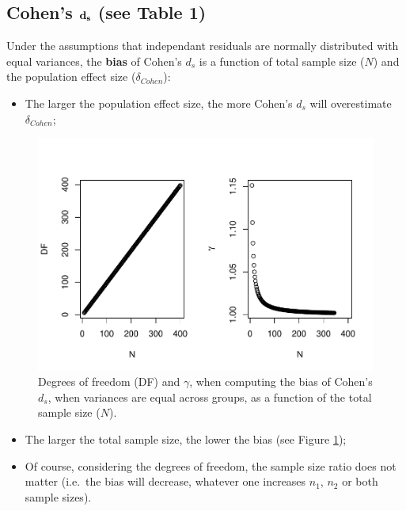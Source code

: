 \documentclass[
  english,
  man]{apa6}
\providecommand{\tightlist}{%
  \setlength{\itemsep}{0pt}\setlength{\parskip}{0pt}}
\begin{document}
\hypertarget{cohens-bf-d_s-see-table-1}{%
\subsection{\texorpdfstring{Cohen's \(\bf d_s\) (see Table 1)}{Cohen's \textbackslash bf d\_s (see Table 1)}}\label{cohens-bf-d_s-see-table-1}}

Under the assumptions that independant residuals are normally distributed with equal variances, the \textbf{bias} of Cohen's \(d_s\) is a function of total sample size (\(N\)) and the population effect size (\(\delta_{Cohen}\)):

\begin{itemize}
\tightlist
\item
  The larger the population effect size, the more Cohen's \(d_s\) will overestimate \(\delta_{Cohen}\);
\end{itemize}

\begin{figure}
\centering
\includegraphics{Theoretical-Bias-of-all-estimators-as-a-function-of-population-parameters_files/figure-latex/biascohendNsize2-1.pdf}
\caption{\label{fig:biascohendNsize2}Degrees of freedom (DF) and \(\gamma\), when computing the bias of Cohen's \(d_s\), when variances are equal across groups, as a function of the total sample size (\(N\)).}
\end{figure}

\begin{itemize}
\item
  The larger the total sample size, the lower the bias (see Figure \ref{fig:biascohendNsize2});
\item
  Of course, considering the degrees of freedom, the sample size ratio does not matter (i.e.~the bias will decrease, whatever one increases \(n_1\), \(n_2\) or both sample sizes).
\end{itemize}
\end{document}
